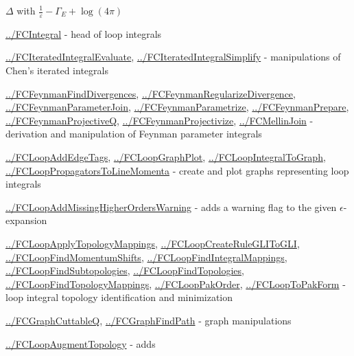 \documentclass[../FeynCalcManual.tex]{subfiles}
\begin{document}
\begin{itemize}
{  \(\Delta\) with \(\frac{1}{\varepsilon} - \Gamma_E + \log (4 \pi)\)
\item
  \hyperlink{../fcintegral}{../FCIntegral} - head of loop integrals
\item
  \hyperlink{../fciteratedintegralevaluate}{../FCIteratedIntegralEvaluate},
  \hyperlink{../fciteratedintegralsimplify}{../FCIteratedIntegralSimplify}
  - manipulations of Chen's iterated integrals
\item
  \hyperlink{../fcfeynmanfinddivergences}{../FCFeynmanFindDivergences},
  \hyperlink{../fcfeynmanregularizedivergence}{../FCFeynmanRegularizeDivergence},
  \hyperlink{../fcfeynmanparameterjoin}{../FCFeynmanParameterJoin},
  \hyperlink{../fcfeynmanparametrize}{../FCFeynmanParametrize},
  \hyperlink{../fcfeynmanprepare}{../FCFeynmanPrepare},
  \hyperlink{../fcfeynmanprojectiveq}{../FCFeynmanProjectiveQ},
  \hyperlink{../fcfeynmanprojectivize}{../FCFeynmanProjectivize},
  \hyperlink{../fcmellinjoin}{../FCMellinJoin} - derivation and
  manipulation of Feynman parameter integrals
\item
  \hyperlink{../fcloopaddedgetags}{../FCLoopAddEdgeTags},
  \hyperlink{../fcloopgraphplot}{../FCLoopGraphPlot},
  \hyperlink{../fcloopintegraltograph}{../FCLoopIntegralToGraph},
  \hyperlink{../fclooppropagatorstolinemomenta}{../FCLoopPropagatorsToLineMomenta}
  - create and plot graphs representing loop integrals
\item
  \hyperlink{../fcloopaddmissinghigherorderswarning}{../FCLoopAddMissingHigherOrdersWarning}
  - adds a warning flag to the given \(\epsilon\)-expansion
\item
  \hyperlink{../fcloopapplytopologymappings}{../FCLoopApplyTopologyMappings},
  \hyperlink{../fcloopcreateruleglitogli}{../FCLoopCreateRuleGLIToGLI},
  \hyperlink{../fcloopfindmomentumshifts}{../FCLoopFindMomentumShifts},
  \hyperlink{../fcloopfindintegralmappings}{../FCLoopFindIntegralMappings},
  \hyperlink{../fcloopfindsubtopologies}{../FCLoopFindSubtopologies},
  \hyperlink{../fcloopfindtopologies}{../FCLoopFindTopologies},
  \hyperlink{../fcloopfindtopologymappings}{../FCLoopFindTopologyMappings},
  \hyperlink{../fclooppakorder}{../FCLoopPakOrder},
  \hyperlink{../fclooptopakform}{../FCLoopToPakForm} - loop integral
  topology identification and minimization
\item
  \hyperlink{../fcgraphcuttableq}{../FCGraphCuttableQ},
  \hyperlink{../fcgraphfindpath}{../FCGraphFindPath} - graph
  manipulations
\item
  \hyperlink{../fcloopaugmenttopology}{../FCLoopAugmentTopology} - adds
}
\end{itemize}
\end{document}
